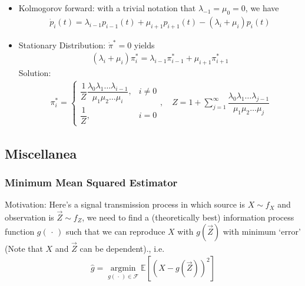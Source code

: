 \begin{itemize}[topsep=2pt,itemsep=0pt]
    \item Kolmogorov forward: with a trivial notation that $ \lambda _{-1}=\mu _0=0 $, we have
    \begin{align}
         \dot{p}_i(t)=\lambda _{i-1}p_{i-1}(t)+\mu _{i+1}p_{i+1}(t)-(\lambda _i+\mu _i)p_i(t)
    \end{align}
    \item Stationary Distribution: $ \dot{\pi}^*=0 $ yields 
    \begin{align}
        (\lambda _i+\mu _i)\pi_i^*=\lambda _{i-1}\pi_{i-1}^*+\mu _{i+1}\pi^*_{i+1} 
    \end{align}
    Solution:
    \begin{align}
        \pi^*_i=\begin{cases}
            \dfrac{1}{Z}\dfrac{\lambda _0\lambda _1\ldots\lambda _{i-1}}{\mu _1\mu _2\ldots\mu _i},&i\neq 0\\
            \dfrac{1}{Z},&i=0
        \end{cases},\quad Z=1+\sum_{j=1}^\infty \dfrac{\lambda _0\lambda _1\ldots\lambda _{j-1}}{\mu _1\mu _2\ldots\mu _j}
    \end{align}
    
\end{itemize}





























\subsection{Miscellanea}

\subsubsection{Minimum Mean Squared Estimator}\label{SubSecMMSE}
    Motivation: Here's a signal transmission process in which source is $ X\sim f_{X} $ and observation is $ \vec{Z}\sim f_Z $, we need to find a (theoretically best) information process function $ g(\, \cdot \, ) $ such that we can reproduce $ X $ with $ g(\vec{Z}) $ with minimum `error' (Note that $ X$ and $\vec{Z} $ can be dependent)., i.e.
    \begin{align}
        \hat{g}=\mathop{\arg\min}\limits_{g(\, \cdot \, )\in \mathscr{F}} \mathbb{E}\left[ (X-g(\vec{Z}))^2 \right] 
    \end{align}


